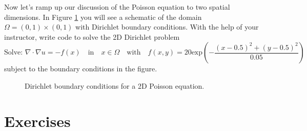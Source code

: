 \begin{problem}
    Now let's ramp up our discussion of the Poisson equation to two spatial dimensions.
    In Figure \ref{fig:2DPoisson_BC} you will see a schematic of the domain
    $\Omega=(0,1)\times (0,1)$ with Dirichlet boundary conditions.  With the help of your
    instructor, write code to solve the 2D Dirichlet problem
    \[ \text{Solve: } \nabla \cdot \nabla u = - f(x) \quad \text{in} \quad x \in \Omega \quad \text{with} \quad
    f(x,y) = 20\text{exp}\left( -\frac{(x-0.5)^2 + (y-0.5)^2}{0.05} \right) \]
    subject to the boundary conditions in the figure.

    \begin{figure}[ht!]
        \centering
        \caption{Dirichlet boundary conditions for a 2D Poisson equation.}
        \label{fig:2DPoisson_BC}
    \end{figure}
\end{problem}






\newpage\section{Exercises}

